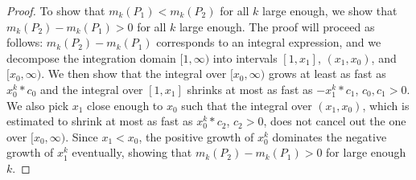 \documentclass[a4paper]{scrreprt}
\theoremstyle{definition}
\begin{document}
    \begin{proof}
        To show that $m_k(P_1) < m_k(P_2)$ for all $k$ large enough, we show that $m_k(P_2) - m_k(P_1) > 0$ for all $k$ large enough.
        The proof will proceed as follows: $m_k(P_2) - m_k(P_1)$ corresponds to an integral expression, and we decompose the integration domain $[1, \infty)$ into intervals $[1, x_1]$, $(x_1, x_0)$, and $[x_0, \infty)$. We then show that the integral over $[x_0, \infty)$ grows at least as fast as $x_0^k*c_0$ and the integral over $[1, x_1]$ shrinks at most as fast as $-x_1^k*c_1$, $c_0, c_1 > 0$. We also pick $x_1$ close enough to $x_0$ such that the integral over $(x_1, x_0)$, which is estimated to shrink at most as fast as $x_0^k * c_2$, $c_2 > 0$, does not cancel out the one over $[x_0, \infty)$. Since $x_1 < x_0$, the positive growth of $x_0^k$ dominates the negative growth of $x_1^k$ eventually, showing that $m_k(P_2) - m_k(P_1) > 0$ for large enough $k$.
        

\end{proof}
\end{document}
